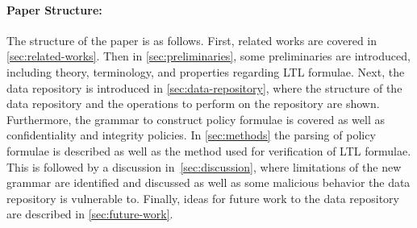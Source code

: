 \paragraph{Paper Structure:}
The structure of the paper is as follows. First, related works are covered in \autoref{sec:related-works}. Then in \autoref{sec:preliminaries}, some preliminaries are introduced, including theory, terminology, and properties regarding LTL formulae. Next, the data repository is introduced in \autoref{sec:data-repository}, where the structure of the data repository and the operations to perform on the repository are shown. Furthermore, the grammar to construct policy formulae is covered as well as confidentiality and integrity policies. In \autoref{sec:methods} the parsing of policy formulae is described as well as the method used for verification of LTL formulae. This is followed by a discussion in~\autoref{sec:discussion}, where limitations of the new grammar are identified and discussed as well as some malicious behavior the data repository is vulnerable to. Finally, ideas for future work to the data repository are described in \autoref{sec:future-work}.